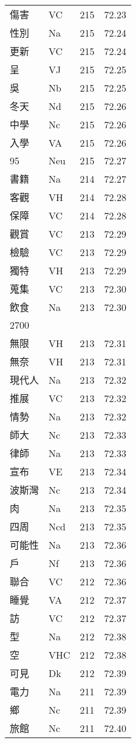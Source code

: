 \documentclass[twocolumn]{book}
\begin{document}
\begin{supertabular}{llrr}
傷害 & VC & 215 &  72.23\\
性別 & Na & 215 &  72.24\\
更新 & VC & 215 &  72.24\\
呈 & VJ & 215 &  72.25\\
吳 & Nb & 215 &  72.25\\
冬天 & Nd & 215 &  72.26\\
中學 & Nc & 215 &  72.26\\
入學 & VA & 215 &  72.26\\
95 & Neu & 215 &  72.27\\
書籍 & Na & 214 &  72.27\\
客觀 & VH & 214 &  72.28\\
保障 & VC & 214 &  72.28\\
觀賞 & VC & 213 &  72.29\\
檢驗 & VC & 213 &  72.29\\
獨特 & VH & 213 &  72.29\\
蒐集 & VC & 213 &  72.30\\
飲食 & Na & 213 &  72.30\\
2700\\
無限 & VH & 213 &  72.31\\
無奈 & VH & 213 &  72.31\\
現代人 & Na & 213 &  72.32\\
推展 & VC & 213 &  72.32\\
情勢 & Na & 213 &  72.32\\
師大 & Nc & 213 &  72.33\\
律師 & Na & 213 &  72.33\\
宣布 & VE & 213 &  72.34\\
波斯灣 & Nc & 213 &  72.34\\
肉 & Na & 213 &  72.35\\
四周 & Ncd & 213 &  72.35\\
可能性 & Na & 213 &  72.36\\
戶 & Nf & 213 &  72.36\\
聯合 & VC & 212 &  72.36\\
睡覺 & VA & 212 &  72.37\\
訪 & VC & 212 &  72.37\\
型 & Na & 212 &  72.38\\
空 & VHC & 212 &  72.38\\
可見 & Dk & 212 &  72.39\\
電力 & Na & 211 &  72.39\\
鄉 & Nc & 211 &  72.39\\
旅館 & Nc & 211 &  72.40\\

\end{supertabular}
\end{document}
